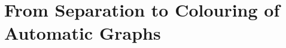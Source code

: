 \section{%
	\AP\label{sec:dichotomy-colouring}%
	From Separation to Colouring of Automatic Graphs
}



